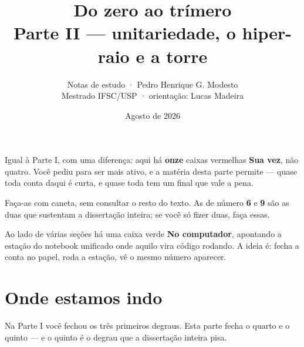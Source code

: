 \documentclass[11pt,a4paper]{article}
\title{\vspace{-1.5cm}\Huge\bfseries Do zero ao trímero\\[0.25cm]
\LARGE\mdseries Parte II — unitariedade, o hiper-raio e a torre}
\author{\large Notas de estudo · Pedro Henrique G. Modesto\\[0.15cm]
\normalsize Mestrado IFSC/USP · orientação: Lucas Madeira}
\date{\normalsize Agosto de 2026}
\begin{document}
\maketitle
\thispagestyle{empty}

\begin{ideia}
Igual à Parte I, com uma diferença: aqui há \textbf{onze} caixas vermelhas
\textbf{Sua vez}, não quatro. Você pediu para ser mais ativo, e a matéria desta parte
permite — quase toda conta daqui é curta, e quase toda tem um final que vale a pena.

Faça-as com caneta, sem consultar o resto do texto. As de número \textbf{6} e
\textbf{9} são as duas que sustentam a dissertação inteira; se você só fizer duas,
faça essas.

Ao lado de várias seções há uma caixa verde \textbf{No computador}, apontando a
estação do notebook unificado onde aquilo vira código rodando. A ideia é: fecha a
conta no papel, roda a estação, vê o mesmo número aparecer.
\end{ideia}

\vspace{0.3cm}

\section*{Onde estamos indo}

Na Parte I você fechou os três primeiros degraus. Esta parte fecha o quarto e o
quinto — e o quinto é o degrau que a dissertação inteira pisa.
\end{document}
